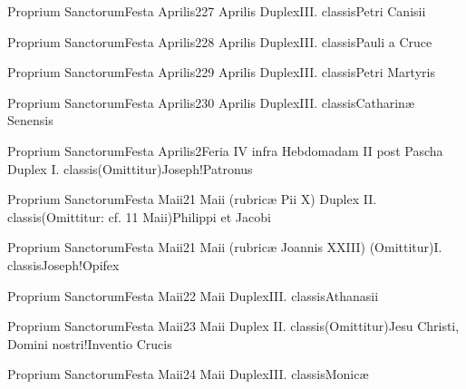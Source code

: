 \documentclass[invitatoriale-romanum.tex]{subfiles}
\begin{document}
	{Proprium Sanctorum}{Festa Aprilis}{2}{27 Aprilis}
	{Duplex}{III. classis}{Petri Canisii}
	{}
	{}

	{Proprium Sanctorum}{Festa Aprilis}{2}{28 Aprilis}
	{Duplex}{III. classis}{Pauli a Cruce}
	{}
	{}

	{Proprium Sanctorum}{Festa Aprilis}{2}{29 Aprilis}
	{Duplex}{III. classis}{Petri Martyris}
	{}
	{}

	{Proprium Sanctorum}{Festa Aprilis}{2}{30 Aprilis}
	{Duplex}{III. classis}{Catharinæ Senensis}
	{}
	{}

\newpage

	{Proprium Sanctorum}{Festa Aprilis}{2}{Feria IV infra Hebdomadam II post Pascha}
	{Duplex I. classis}{(Omittitur)}{Joseph!Patronus}
	{}
	{}


	{Proprium Sanctorum}{Festa Maii}{2}{1 Maii (rubricæ Pii X)}
	{Duplex II. classis}{(Omittitur: cf. 11 Maii)}{Philippi et Jacobi}
	{}
	{}

	{Proprium Sanctorum}{Festa Maii}{2}{1 Maii (rubricæ Joannis XXIII)}
	{(Omittitur)}{I. classis}{Joseph!Opifex}
	{}
	{}

	{Proprium Sanctorum}{Festa Maii}{2}{2 Maii}
	{Duplex}{III. classis}{Athanasii}
	{}
	{}

	{Proprium Sanctorum}{Festa Maii}{2}{3 Maii}
	{Duplex II. classis}{(Omittitur)}{Jesu Christi, Domini nostri!Inventio Crucis}
	{}
	{\invitferia}

	{Proprium Sanctorum}{Festa Maii}{2}{4 Maii}
	{Duplex}{III. classis}{Monicæ}
	{}
	{}
\end{document}
